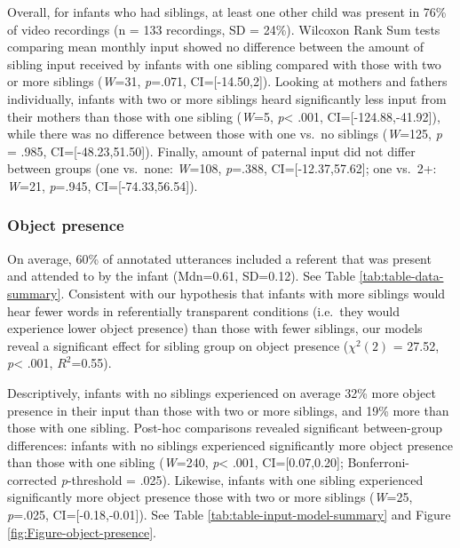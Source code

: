 \documentclass[
  man,floatsintext]{apa6}
\begin{document}
Overall, for infants who had siblings, at least one other child was present in 76\% of video recordings (n = 133 recordings, SD = 24\%). Wilcoxon Rank Sum tests comparing mean monthly input showed no difference between the amount of sibling input received by infants with one sibling compared with those with two or more siblings (\emph{W}=31, \emph{p}=.071, CI={[}-14.50,2{]}). Looking at mothers and fathers individually, infants with two or more siblings heard significantly less input from their mothers than those with one sibling (\emph{W}=5, \emph{p}\textless{} .001, CI={[}-124.88,-41.92{]}), while there was no difference between those with one vs.~no siblings (\emph{W}=125, \emph{p} = .985, CI={[}-48.23,51.50{]}). Finally, amount of paternal input did not differ between groups (one vs.~none: \emph{W}=108, \emph{p}=.388, CI={[}-12.37,57.62{]}; one vs.~2+: \emph{W}=21, \emph{p}=.945, CI={[}-74.33,56.54{]}).

\hypertarget{object-presence}{%
\subsubsection{Object presence}\label{object-presence}}

On average, 60\% of annotated utterances included a referent that was present and attended to by the infant (Mdn=0.61, SD=0.12). See Table \ref{tab:table-data-summary}. Consistent with our hypothesis that infants with more siblings would hear fewer words in referentially transparent conditions (i.e.~they would experience lower object presence) than those with fewer siblings, our models reveal a significant effect for sibling group on object presence (\(\chi^2 (2)\) = 27.52, \emph{p}\textless{} .001, \(R^2\)=0.55).

Descriptively, infants with no siblings experienced on average 32\% more object presence in their input than those with two or more siblings, and 19\% more than those with one sibling. Post-hoc comparisons revealed significant between-group differences: infants with no siblings experienced significantly more object presence than those with one sibling (\emph{W}=240, \emph{p}\textless{} .001, CI={[}0.07,0.20{]}; Bonferroni-corrected \emph{p}-threshold = .025). Likewise, infants with one sibling experienced significantly more object presence those with two or more siblings (\emph{W}=25, \emph{p}=.025, CI={[}-0.18,-0.01{]}). See Table \ref{tab:table-input-model-summary} and Figure \ref{fig:Figure-object-presence}.
\end{document}
